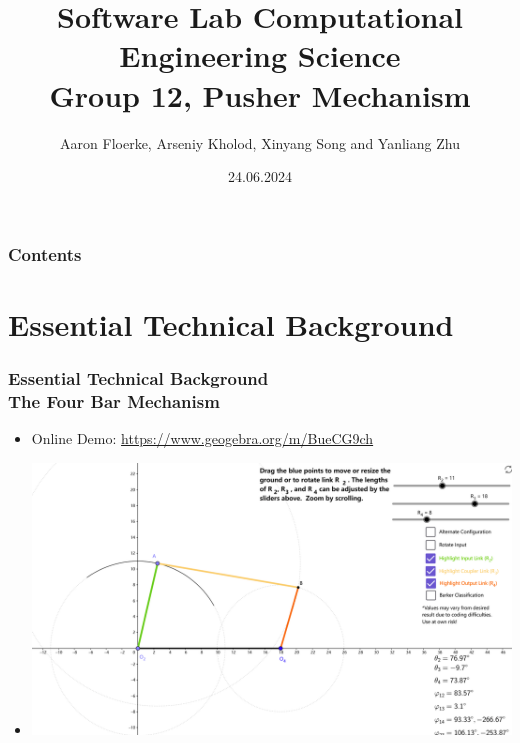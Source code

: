 \documentclass[ucs,10pt]{beamer}
\begin{document}
\title[{\tt info@stce.rwth-aachen.de}]{\textcolor{rwth-blue}{Software Lab Computational Engineering Science} \vspace{.2cm} \\ {\small Group 12, Pusher Mechanism}}
\author[Group 12)]{Aaron Floerke, Arseniy Kholod, Xinyang Song and Yanliang Zhu} 
\date[]{24.06.2024}



\begin{frame}[plain]
\titlepage
\end{frame}

\begin{frame}
	\frametitle{Contents}
\tableofcontents
\end{frame}



\section{Essential Technical Background}

\begin{frame}
\frametitle{Essential Technical Background \\
    \small \color{rwth-blue} The Four Bar Mechanism}
    \begin{itemize}
        \item Online Demo: \url{https://www.geogebra.org/m/BueCG9ch}
        \item \includegraphics[width=\linewidth]{./Used_Picture/Online_Demo_1.png}
    \end{itemize}
\end{frame}
\end{document}
